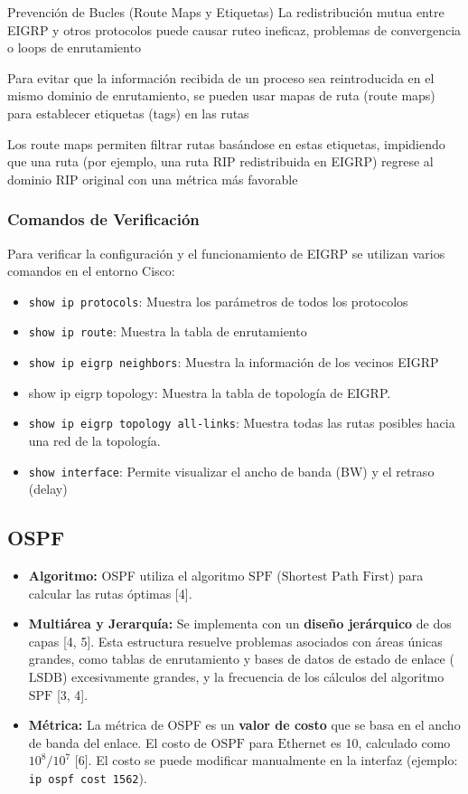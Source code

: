 \documentclass[a5paper]{book}%
\begin{document}
  Prevención de Bucles (Route Maps y Etiquetas)
  La redistribución mutua entre EIGRP y otros protocolos puede causar ruteo ineficaz, problemas de convergencia o loops de enrutamiento
  
  Para evitar que la información recibida de un proceso sea reintroducida en el mismo dominio de enrutamiento, se pueden usar mapas de ruta (route maps) para establecer etiquetas (tags) en las rutas
  
  Los route maps permiten filtrar rutas basándose en estas etiquetas, impidiendo que una ruta (por ejemplo, una ruta RIP redistribuida en EIGRP) regrese al dominio RIP original con una métrica más favorable
  
  
  \subsubsection{Comandos de Verificación}
  Para verificar la configuración y el funcionamiento de EIGRP se utilizan varios comandos en el entorno Cisco:
  
  \begin{itemize}
  	\item \texttt{show ip protocols}: Muestra los parámetros de todos los protocolos
  	\item \texttt{show ip route}: Muestra la tabla de enrutamiento
  	\item \texttt{show ip eigrp neighbors}: Muestra la información de los vecinos EIGRP
  	\item show ip eigrp topology: Muestra la tabla de topología de EIGRP.
  	\item \texttt{show ip eigrp topology all-links}: Muestra todas las rutas posibles hacia una red de la topología.
  	
  	\item \texttt{show interface}: Permite visualizar el ancho de banda (BW) y el retraso (delay)
  \end{itemize}
  
    
  
  \subsection{OSPF}
  
  \begin{itemize}
  	\item \textbf{Algoritmo:} OSPF utiliza el algoritmo $\text{SPF}$ ($\text{Shortest Path First}$) para calcular las rutas óptimas [4].
  	\item \textbf{Multiárea y Jerarquía:} Se implementa con un \textbf{diseño jerárquico} de dos capas [4, 5]. Esta estructura resuelve problemas asociados con áreas únicas grandes, como tablas de enrutamiento y bases de datos de estado de enlace ($\text{LSDB}$) excesivamente grandes, y la frecuencia de los cálculos del algoritmo $\text{SPF}$ [3, 4].
  	\item \textbf{Métrica:} La métrica de OSPF es un \textbf{valor de costo} que se basa en el ancho de banda del enlace. El costo de $\text{OSPF}$ para $\text{Ethernet}$ es 10, calculado como $10^8/10^7$ [6]. El costo se puede modificar manualmente en la interfaz (ejemplo: \texttt{ip ospf cost 1562}).
  \end{itemize}
  
\end{document}
